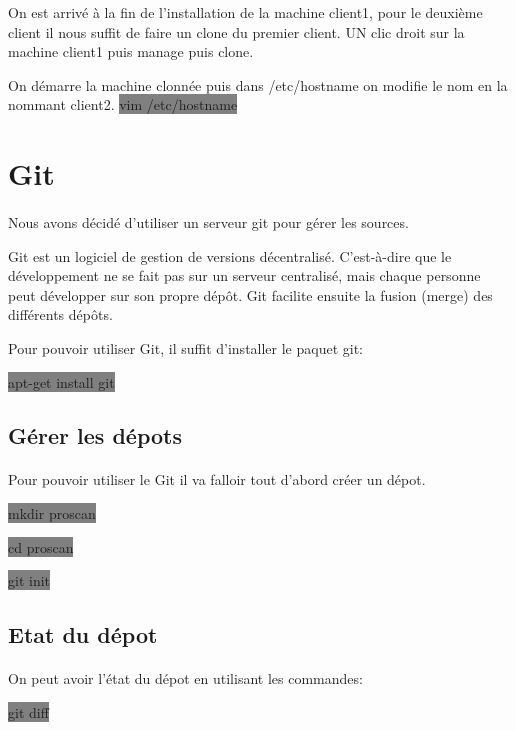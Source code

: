 \documentclass[11pt,a4paper,titlepage, oneside]{article}
\begin{document}
		On est arrivé à la fin de l'installation de la machine client1, pour le deuxième client il nous suffit de faire un clone du premier client. UN clic droit sur la machine client1 puis manage puis clone.

	On démarre la machine clonnée puis dans /etc/hostname on modifie le nom en la nommant client2.
		\colorbox{gray}{vim /etc/hostname}

	
\newpage
\section{{\color{red} Git}}
	\paragraph{}
		Nous avons décidé d'utiliser un serveur git pour gérer les sources.
		
		Git est un logiciel de gestion de versions décentralisé. C'est-à-dire que le développement ne se fait pas sur un serveur centralisé, mais chaque personne peut développer sur son propre dépôt. Git facilite ensuite la fusion (merge) des différents dépôts.

		Pour pouvoir utiliser Git, il suffit d'installer le paquet git:
	
		\colorbox{gray} {apt-get install git}

	\subsection{{\color{blue} Gérer les dépots}}
		\paragraph{}
			Pour pouvoir utiliser le Git il va falloir tout d'abord créer un dépot.
			
			\colorbox{gray}{mkdir proscan}

				\colorbox{gray}{cd proscan}
	
				\colorbox{gray}{git init}
	
	\subsection{{\color{blue} Etat du dépot}}	
		\paragraph{}
		On peut avoir l'état du dépot en utilisant les commandes:
		
			\colorbox{gray}{git diff}
			
\end{document}
